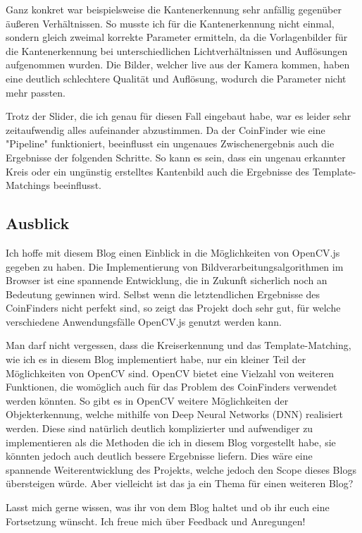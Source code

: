 Ganz konkret war beispielsweise die Kantenerkennung sehr anfällig gegenüber äußeren Verhältnissen. So musste ich für die Kantenerkennung nicht einmal, sondern gleich zweimal korrekte Parameter ermitteln, da die Vorlagenbilder für die Kantenerkennung bei unterschiedlichen Lichtverhältnissen und Auflösungen aufgenommen wurden. Die Bilder, welcher live aus der Kamera kommen, haben eine deutlich schlechtere Qualität und Auflösung, wodurch die Parameter nicht mehr passten.

Trotz der Slider, die ich genau für diesen Fall eingebaut habe, war es leider sehr zeitaufwendig alles aufeinander abzustimmen. Da der CoinFinder wie eine "Pipeline" funktioniert, beeinflusst ein ungenaues Zwischenergebnis auch die Ergebnisse der folgenden Schritte. So kann es sein, dass ein ungenau erkannter Kreis oder ein ungünstig erstelltes Kantenbild auch die Ergebnisse des Template-Matchings beeinflusst. 

\subsection{Ausblick}
Ich hoffe mit diesem Blog einen Einblick in die Möglichkeiten von OpenCV.js gegeben zu haben. Die Implementierung von Bildverarbeitungsalgorithmen im Browser ist eine spannende Entwicklung, die in Zukunft sicherlich noch an Bedeutung gewinnen wird. Selbst wenn die letztendlichen Ergebnisse des CoinFinders nicht perfekt sind, so zeigt das Projekt doch sehr gut, für welche verschiedene Anwendungsfälle OpenCV.js genutzt werden kann.

Man darf nicht vergessen, dass die Kreiserkennung und das Template-Matching, wie ich es in diesem Blog implementiert habe, nur ein kleiner Teil der Möglichkeiten von OpenCV sind. OpenCV bietet eine Vielzahl von weiteren Funktionen, die womöglich auch für das Problem des CoinFinders verwendet werden könnten. So gibt es in OpenCV weitere Möglichkeiten der Objekterkennung, welche mithilfe von Deep Neural Networks (DNN) realisiert werden. Diese sind natürlich deutlich komplizierter und aufwendiger zu implementieren als die Methoden die ich in diesem Blog vorgestellt habe, sie könnten jedoch auch deutlich bessere Ergebnisse liefern. Dies wäre eine spannende Weiterentwicklung des Projekts, welche jedoch den Scope dieses Blogs übersteigen würde. Aber vielleicht ist das ja ein Thema für einen weiteren Blog?

Lasst mich gerne wissen, was ihr von dem Blog haltet und ob ihr euch eine Fortsetzung wünscht. Ich freue mich über Feedback und Anregungen!